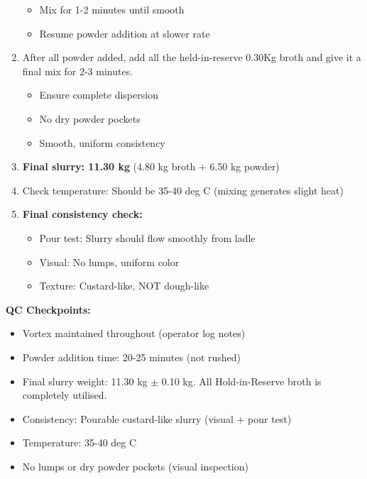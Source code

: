 \begin{enumerate}[leftmargin=1.5em]
\begin{itemize}
  \item Mix for 1-2 minutes until smooth
  \item Resume powder addition at slower rate
  \end{itemize}
\item After all powder added, add all the held-in-reserve 0.30Kg broth and give it a final mix for 2-3 minutes. 
  \begin{itemize}
  \item Ensure complete dispersion
  \item No dry powder pockets
  \item Smooth, uniform consistency
  \end{itemize}
\item \textbf{Final slurry: 11.30 kg} (4.80 kg broth + 6.50 kg powder)
\item Check temperature: Should be 35-40 deg C (mixing generates slight heat)
\item \textbf{Final consistency check:}
  \begin{itemize}
  \item Pour test: Slurry should flow smoothly from ladle
  \item Visual: No lumps, uniform color
  \item Texture: Custard-like, NOT dough-like
  \end{itemize}
\end{enumerate}

\textbf{QC Checkpoints:}
\begin{itemize}
\item Vortex maintained throughout (operator log notes)
\item Powder addition time: 20-25 minutes (not rushed)
\item Final slurry weight: 11.30 kg $\pm$ 0.10 kg. All Hold-in-Reserve broth is completely utilised. 
\item Consistency: Pourable custard-like slurry (visual + pour test)
\item Temperature: 35-40 deg C
\item No lumps or dry powder pockets (visual inspection)
\end{itemize}

